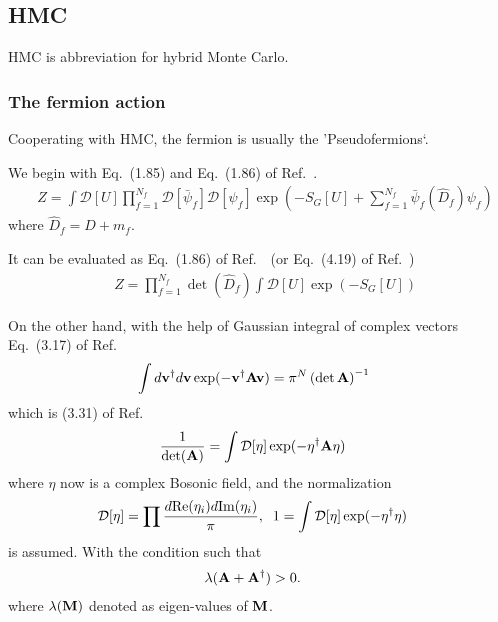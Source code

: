 \subsection{\label{hmc}HMC}

HMC is abbreviation for hybrid Monte Carlo.

\subsubsection{\label{hmc_scheme}The fermion action}

Cooperating with HMC, the fermion is usually the 'Pseudofermions`.

We begin with Eq.~(1.85) and Eq.~(1.86) of Ref.~\cite{latticeqcdbook2017}.
\begin{equation}
\begin{split}
&Z=\int \mathcal{D}[U] \prod _{f=1}^{N_f} \mathcal {D}[\bar{\psi}_f]\mathcal {D}[\psi _f]\exp \left(-S_G[U]+\sum _{f=1}^{N_f}\bar{\psi} _f\left(\hat{D}_f\right)\psi _f\right)
\end{split}
\end{equation}
where $\hat{D}_f=D+m_f$.

It can be evaluated as Eq.~(1.86) of Ref.~\cite{latticeqcdbook2017}~(or Eq.~(4.19) of Ref.~\cite{condensedmatterbookAltland})
\begin{equation}
\begin{split}
&Z=\prod _{f=1}^{N_f} \det \left(\hat{D}_f\right)\int \mathcal{D}[U] \exp \left(-S_G[U]\right)
\end{split}
\end{equation}

On the other hand, with the help of Gaussian integral of complex vectors Eq.~(3.17) of Ref.~\cite{condensedmatterbookAltland}
\begin{equation}
\begin{split}
&\int d{\bf v}^{\dagger}d{\bf v} \exp (-{\bf v}^{\dagger} {\bf A} {\bf v})=\pi ^N \left(\det {\bf A}\right)^{-1}
\end{split}
\end{equation}
which is (3.31) of Ref.~\cite{latticeqcdbook2017}
\begin{equation}
\begin{split}
&\frac{1}{ \det ({\bf A}) }=\int \mathcal{D}[\eta] \exp (-\eta^{\dagger} {\bf A} \eta)
\end{split}
\end{equation}
where $\eta$ now is a complex Bosonic field, and the normalization
\begin{equation}
\begin{split}
&\mathcal{D}[\eta] = \prod \frac{d{\rm Re}(\eta _i)d{\rm Im}(\eta _i)}{\pi},\;\;1=\int \mathcal{D}[\eta] \exp (-\eta^{\dagger} \eta)
\end{split}
\end{equation}
is assumed. With the condition such that
\begin{equation}
\begin{split}
&\lambda ({\bf A}+{\bf A}^{\dagger}) > 0.
\end{split}
\end{equation}
where $\lambda ({\bf M})$ denoted as eigen-values of ${\bf M}$.

